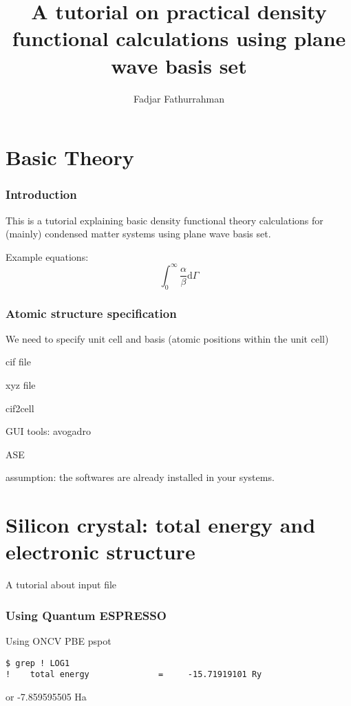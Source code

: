 \documentclass[a4paper]{paper}
\begin{document}
\title{A tutorial on practical density functional calculations using plane
wave basis set}

\author{Fadjar Fathurrahman}
\maketitle

\part{Basic Theory}

\section{Introduction}

This is a tutorial explaining basic density functional theory calculations
for (mainly) condensed matter systems using plane wave basis set.

Example equations:
\[
\int_{0}^{\infty}\frac{\alpha}{\beta}\mathrm{d}\Gamma
\]

\section{Atomic structure specification}

We need to specify unit cell and basis (atomic positions within the unit cell)

cif file

xyz file

cif2cell

GUI tools: avogadro

ASE


assumption: the softwares are already installed in your systems.


\part{Silicon crystal: total energy and electronic structure}

A tutorial about input file

\section{Using Quantum ESPRESSO}

Using ONCV PBE pspot
\begin{verbatim}
$ grep ! LOG1 
!    total energy              =     -15.71919101 Ry
\end{verbatim}
or  -7.859595505 Ha
\end{document}
